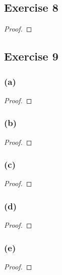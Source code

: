 \documentclass[14pt]{extarticle}
\begin{document}
\subsection{Exercise 8}

\begin{proof}

\end{proof}

\subsection{Exercise 9}

\subsubsection{(a)}

\begin{proof}

\end{proof}

\subsubsection{(b)}

\begin{proof}

\end{proof}

\subsubsection{(c)}

\begin{proof}

\end{proof}

\subsubsection{(d)}

\begin{proof}

\end{proof}

\subsubsection{(e)}

\begin{proof}

\end{proof}
\end{document}
